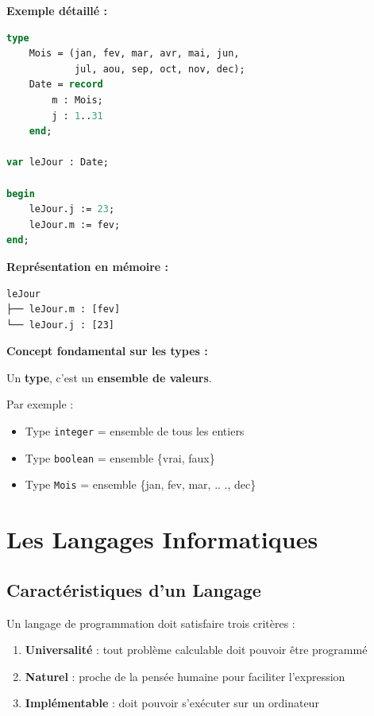 \documentclass[12pt,a4paper]{article}
\begin{document}
\begin{exemple}
\textbf{Exemple détaillé :}
\begin{lstlisting}[language=Pascal]
type 
    Mois = (jan, fev, mar, avr, mai, jun, 
            jul, aou, sep, oct, nov, dec);
    Date = record 
        m : Mois; 
        j : 1..31 
    end;
    
var leJour : Date;

begin
    leJour.j := 23;
    leJour.m := fev;
end;
\end{lstlisting}

\textbf{Représentation en mémoire :}
\begin{verbatim}
leJour
├── leJour.m : [fev]
└── leJour.j : [23]
\end{verbatim}
\end{exemple}

\begin{notecours}
\textbf{Concept fondamental sur les types :}

Un \textbf{type}, c'est un \textbf{ensemble de valeurs}. 

Par exemple :
\begin{itemize}
    \item Type \texttt{integer} = ensemble de tous les entiers
    \item Type \texttt{boolean} = ensemble \{vrai, faux\}
    \item Type \texttt{Mois} = ensemble \{jan, fev, mar, .. ., dec\}
\end{itemize}
\end{notecours}

\newpage
\section{Les Langages Informatiques}

\subsection{Caractéristiques d'un Langage}

\begin{important}
Un langage de programmation doit satisfaire trois critères : 

\begin{enumerate}
    \item \textcolor{titrebleu}{\textbf{Universalité}} : tout problème calculable doit pouvoir être programmé
    \item \textcolor{defvert}{\textbf{Naturel}} : proche de la pensée humaine pour faciliter l'expression
    \item \textcolor{algoviolet}{\textbf{Implémentable}} : doit pouvoir s'exécuter sur un ordinateur
\end{enumerate}
\end{important}
\end{document}
